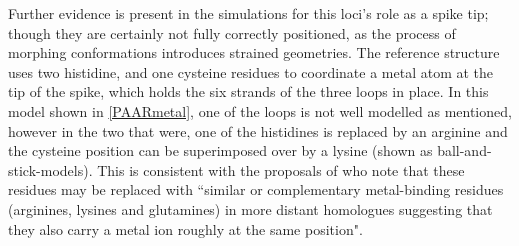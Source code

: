 Further evidence is present in the simulations for this loci's role as a spike tip; though they are certainly not fully correctly positioned, as the process of morphing conformations introduces strained geometries. The reference structure uses two histidine, and one cysteine residues to coordinate a metal atom at the tip of the spike, which holds the six strands of the three loops in place. In this model shown in \vref{PAARmetal}, one of the loops is not well modelled as mentioned, however in the two that were, one of the histidines is replaced by an arginine and the cysteine position can be superimposed over by a lysine (shown as ball-and-stick-models). This is consistent with the proposals of \cite{Shneider2013} who note that these residues may be replaced with ``similar or complementary metal-binding residues (arginines, lysines and glutamines) in more distant homologues suggesting that they also carry a metal ion roughly at the same position".

